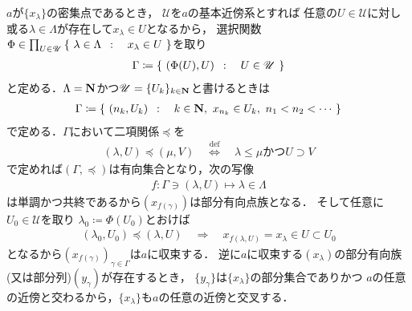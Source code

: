 	\begin{prf}
		$a$が$\{x_\lambda\}$の密集点であるとき，
		$\mathscr{U}$を$a$の基本近傍系とすれば
		任意の$U \in \mathscr{U}$に対し
		或る$\lambda \in \Lambda$が存在して$x_\lambda \in U$となるから，
		選択関数$\Phi \in \prod_{U \in \mathscr{U}} 
		\left\{\ \lambda \in \Lambda\ \, : \quad x_\lambda \in U\ \right\}$を取り
		\begin{align}
			\Gamma \coloneqq \left\{\ (\Phi(U),U)\ \, : \quad U \in \mathscr{U}\ \right\}
		\end{align}
		と定める．$\Lambda = \mathbf{N}$かつ$\mathscr{U} = \{U_k\}_{k \in \mathbf{N}}$と書けるときは
		\begin{align}
			\Gamma \coloneqq \left\{\ (n_k,U_k)\ \, : \quad k \in \mathbf{N},\ x_{n_k} \in U_k,\ n_1 < n_2 < \cdots\ \right\}
		\end{align}
		で定める．$\Gamma$において二項関係$\preceq$を
		\begin{align}
			(\lambda,U) \preceq (\mu,V) 
			\quad \overset{\mathrm{def}}{\Longleftrightarrow} \quad
			\mbox{$\lambda \leq \mu$かつ$U \supset V$}
		\end{align}
		で定めれば$(\Gamma,\preceq)$は有向集合となり，次の写像
		\begin{align}
			f:\Gamma \ni (\lambda,U) \longmapsto \lambda \in \Lambda
		\end{align}
		は単調かつ共終であるから$(x_{f(\gamma)})$は部分有向点族となる．
		そして任意に$U_0 \in \mathscr{U}$を取り
		$\lambda_0 \coloneqq \Phi(U_0)$とおけば
		\begin{align}
			(\lambda_0,U_0) \preceq (\lambda,U)
			\quad \Longrightarrow \quad
			x_{f(\lambda,U)} = x_\lambda \in U \subset U_0
		\end{align}
		となるから$(x_{f(\gamma)})_{\gamma \in \Gamma}$は$a$に収束する．
		逆に$a$に収束する$(x_\lambda)$の部分有向族(又は部分列)$(y_\gamma)$が存在するとき，
		$\{y_\gamma\}$は$\{x_\lambda\}$の部分集合でありかつ
		$a$の任意の近傍と交わるから，$\{x_\lambda\}$も$a$の任意の近傍と交叉する．
		\QED
	\end{prf}